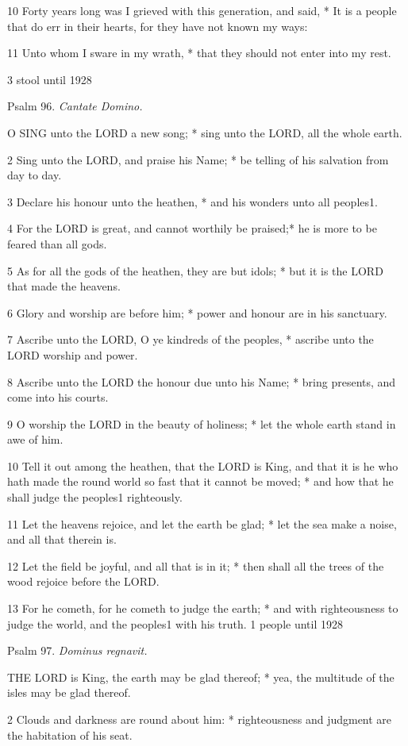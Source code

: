 10 Forty years long was I grieved with this generation,
and said, * It is a people that do err in their hearts, for they have
not known my ways:

11 Unto whom I sware in my wrath, * that they should
not enter into my rest.

3
stool until
1928

Psalm
96. \emph{Cantate Domino.}

O
SING unto the LORD a new song; * sing unto the LORD, all the whole earth.

2 Sing unto the LORD, and praise his Name; * be telling
of his salvation from day to day.

3 Declare
his honour unto the heathen, * and his wonders unto all peoples1.

4 For the LORD is great, and cannot worthily be praised;*
he is more to be feared than all gods.

5 As for all the gods of the heathen, they are but idols;
* but it is the LORD that made the heavens.

6 Glory and worship are before him; * power and honour are
in his sanctuary.

7 Ascribe unto the LORD, O ye kindreds of the peoples, *
ascribe unto the LORD worship and power.

8 Ascribe unto the LORD the honour due unto his Name; *
bring presents, and come into his courts.

9 O worship the LORD in the beauty of holiness; * let the
whole earth stand in awe of him.

10 Tell it out among the heathen, that the LORD is King,
and that it is he who hath made the round world so fast that it cannot
be moved; * and how that he shall judge the peoples1 righteously.

11 Let the heavens rejoice, and let the earth be glad; *
let the sea make a noise, and all that therein is.

12 Let the field be joyful, and all that is in it; * then
shall all the trees of the wood rejoice before the LORD.

13 For he cometh, for he cometh to judge the earth; * and
with righteousness to judge the world, and the peoples1 with
his truth.
1 people until
1928

Psalm 97. \emph{Dominus regnavit.}

THE
LORD is King, the earth may be glad thereof; * yea, the multitude of the
isles may be glad thereof.

2 Clouds and darkness are round about him: * righteousness
and judgment are the habitation of his seat.

